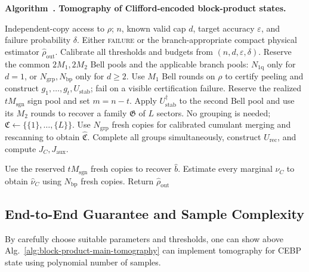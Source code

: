 \documentclass[
  aps,
  prx,
  reprint,
  superscriptaddress,
  amsmath,
  amssymb,
  nofootinbib,
  longbibliography
]{revtex4-2}
\newenvironment{inlinealgorithm}[2]{%
  \par\medskip
  \refstepcounter{figure}%
  \label{#1}%
  \noindent\textbf{Algorithm~\thefigure. #2.}%
  \par\smallskip
}{%
  \par\medskip
}
\begin{document}
\begin{inlinealgorithm}{alg:block-product-main-tomography}{Tomography of Clifford-encoded block-product states}
\begin{algorithmic}[1]
\Require Independent-copy access to $\rho$; $n$, known valid cap $d$, target
accuracy $\varepsilon$, and failure probability $\delta$.
\Ensure Either \textsc{failure} or the branch-appropriate compact physical
estimator $\widehat\rho_{\mathrm{out}}$. 
\State Calibrate all thresholds and budgets from $(n,d,\varepsilon,\delta)$.
Reserve the common $2M_1,2M_2$ Bell pools and the applicable branch pools:
$N_{1\mathrm q}$ only for $d=1$, or $N_{\mathrm{grp}},N_{\mathrm{bp}}$ only
for $d\ge2$.
\State Use $M_1$ Bell rounds on $\rho$ to certify peeling and construct
$g_1,\ldots,g_t,U_{\mathrm{stab}}$; fail on a visible certification failure.
\State Reserve the realized $tM_{\mathrm{sgn}}$ sign
pool and set $m=n-t$.
\State Apply $U_{\mathrm{stab}}^\dagger$ to the second Bell pool and use its
$M_2$ rounds to recover a family $\mathfrak G$ of $L$ sectors.
  \State No grouping is needed; $\mathfrak C\gets \{\{1\},\dots,\{L\}\}$.
\Else
  \State Use $N_{\mathrm{grp}}$ fresh copies for
  calibrated cumulant merging and rescanning to obtain
  $\widehat{\mathfrak C}$.
\EndIf
\State Complete all groups simultaneously, construct $U_{\mathrm{rec}}$, and
compute $J_C,J_{\mathrm{aux}}$.

\State Use the reserved $tM_{\mathrm{sgn}}$ fresh copies to recover
$\widehat b$.
\State Estimate every marginal $\nu_C$  to obtain $\widehat\nu_C$  using $N_{\mathrm{bp}}$ fresh copies. 
\State Return 
$\widehat\rho_{\mathrm{out}}$
\end{algorithmic}
\end{inlinealgorithm}



\subsection{End-to-End Guarantee and Sample Complexity}


By carefully choose suitable parameters and thresholds, one can show above Alg.~\ref{alg:block-product-main-tomography} can implement tomography for CEBP state using polynomial number of samples. 
\end{document}
